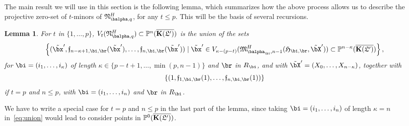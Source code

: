 \documentclass[12pt]{article}
\newtheorem{lemma}[definition]{Lemma}
\begin{document}
The main result we will use in this section is the following lemma,
which summarizes how the above process allows us to describe the
projective zero-set of $t$-minors of $\mathfrak{N}^H_{\balpha,q}$, for
any $t \le p$. This will be the basis of several recursions.
\begin{lemma}\label{lemma:union}
  For $t$ in $\{1,\dots,p\}$, $V_t(\mathfrak{N}^H_{\balpha,q}) \subset \P^{n}(\KKGpbar)$ is the
  union of the sets
 \begin{align}\label{eq:union}
 \left \{(\tilde\bx',\mathfrak{f}_{n-\kappa+1,\bi,\br}(\tilde\bx'),\dots,\mathfrak{f}_{n,\bi,\br}(\tilde\bx')) \mid \tilde\bx' \in
  V_{\kappa-(p-t)}(\mathfrak{M}^H_{\balpha_\bi,n-1}(\mathfrak{H}_{\bi,\br},\tilde\bX')) \subset \P^{n-\kappa}(\KKGpbar)\right \},   
 \end{align}
 for $\bi=(i_1,\dots,i_\kappa)$ of length $\kappa \in \{p-t+1,\dots,\min(p,n-1)\}$ and $\br$ in $R_\bi$,
 and with $\tilde\bX'=(X_0,\dots,X_{n-\kappa})$, together with
 $$\left \{
 (1,\mathfrak{f}_{1,\bi,\br}(1),\dots,\mathfrak{f}_{n,\bi,\br}(1))\right
 \}$$ if $t=p$ and $n \le p$, with $\bi=(i_1,\dots,i_n)$ and $\br$ in $R_\bi$.
\end{lemma}
\noindent We have to write a special case for $t=p$ and $n \le p$ in the last part of the lemma,
since taking $\bi=(i_1,\dots,i_n)$ of length $\kappa=n$
in~\eqref{eq:union} would lead to consider points in $\mathbb{P}^0(\overline{\mathbf{K}(\mathfrak{L}')})$.
\end{document}
